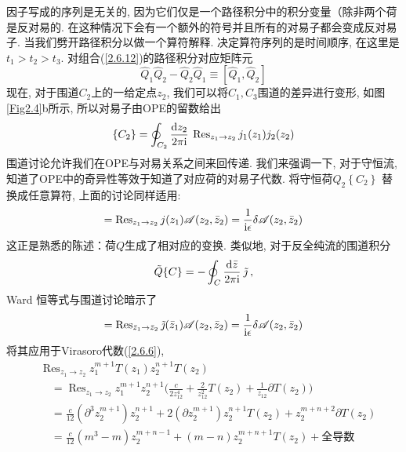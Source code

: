 因子写成的序列是无关的, 因为它们仅是一个路径积分中的积分变量（除非两个荷是反对易的. 在这种情况下会有一个额外的符号并且所有的对易子都会变成反对易子. 
当我们劈开路径积分以做一个算符解释. 决定算符序列的是时间顺序, 在这里是$t_{1}>t_{2}>t_{3}$. 对组合(\ref{2.6.12})的路径积分对应矩阵元
\begin{equation}
\hat{Q}_{1} \hat{Q}_{2}-\hat{Q}_{2} \hat{Q}_{1} \equiv [\hat{Q}_{1}, \hat{Q}_{2}]
\end{equation}
现在, 对于围道$C_2$上的一给定点$z_2$, 我们可以将$C_1, C_3$围道的差异进行变形, 如图\ref{Fig2.4}b所示, 所以对易子由OPE的留数给出
\begin{equation}
[Q_{1}, Q_{2}]\{C_{2}\}=\oint_{C_{2}} \frac{\dif z_{2}}{2 \pi \mi} \: \operatorname{Res}_{z_{1} \to z_{2}} j_{1}(z_{1}) j_{2}(z_{2}) \label{2.6.14}
\end{equation}
围道讨论允许我们在OPE与对易关系之间来回传递. 我们来强调一下, 对于守恒流, 知道了OPE中的奇异性等效于知道了对应荷的对易子代数. 将守恒荷$Q_{2}\left\{C_{2}\right\}$ 替换成任意算符, 上面的讨论同样适用:
\begin{equation}
[Q, \mathscr{A}(z_{2}, \bar{z}_{2})]=\operatorname{Res}_{z_{1} \to z_{2}} j(z_{1}) \mathscr{A}(z_{2}, \bar{z}_{2})
=\frac{1}{\mi \epsilon} \delta \mathscr{A}(z_{2}, \bar{z}_{2}) \label{2.6.15}
\end{equation}
这正是熟悉的陈述：荷$Q$生成了相对应的变换. 类似地, 对于反全纯流的围道积分
\begin{equation}
\tilde{Q}\{C\}=-\oint_{C} \frac{\mathrm{d} \bar{z}}{2 \pi \mathrm{i}} \: \tilde{\jmath} \:, \label{2.6.16}
\end{equation}
Ward 恒等式与围道讨论暗示了
\begin{equation}
[\tilde{Q}, \mathscr{A}(z_{2}, \bar{z}_{2})]=\operatorname{Res}_{\bar{z}_{1} \to \bar{z}_{2}} \tilde{\jmath}(\bar{z}_{1}) 
\mathscr{A}(z_{2}, \bar{z}_{2})=\frac{1}{\mi \epsilon} \delta \mathscr{A}(z_{2}, \bar{z}_{2}) \label{2.6.17}
\end{equation}
将其应用于Virasoro代数(\ref{2.6.6}), 
\begin{align}
&\operatorname{Res}_{z_{1} \to z_{2}} z_{1}^{m+1} T(z_{1}) z_{2}^{n+1} T(z_{2})  \nonumber \\
&\quad =\operatorname{Res}_{z_{1} \rightarrow z_{2}} z_{1}^{m+1} z_{2}^{n+1}\Biggl(\frac{c}{2 z_{12}^{4}}+\frac{2}{z_{12}^{2}} T(z_{2})
+\frac{1}{z_{12}} \partial T(z_{2})\Biggr) \nonumber \\
&\quad =\frac{c}{12}(\partial^{3} z_{2}^{m+1}) z_{2}^{n+1}+2(\partial z_{2}^{m+1}) z_{2}^{n+1} T(z_{2})
+z_{2}^{m+n+2} \partial T(z_{2}) \nonumber \\
&\quad =\frac{c}{12}(m^{3}-m) z_{2}^{m+n-1}+(m-n) z_{2}^{m+n+1} T(z_{2})+\text {全导数}  \label{2.6.18}
\end{align}
